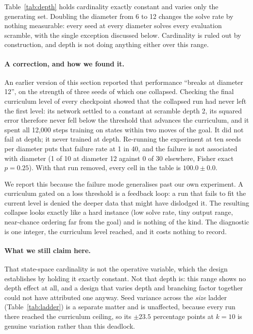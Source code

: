 \documentclass{article}
\begin{document}
Table~\ref{tab:depth} holds cardinality exactly constant and varies only the
generating set. Doubling the diameter from 6 to 12 changes the solve rate by
nothing measurable: every seed at every diameter solves every evaluation
scramble, with the single exception discussed below. Cardinality is ruled out by
construction, and depth is not doing anything either over this range.

\paragraph{A correction, and how we found it.} An earlier version of this section
reported that performance ``breaks at diameter 12'', on the strength of three
seeds of which one collapsed. Checking the final curriculum level of every
checkpoint showed that the collapsed run had never left the first level: its
network settled to a constant at scramble depth 2, its squared error therefore
never fell below the threshold that advances the curriculum, and it spent all
12{,}000 steps training on states within two moves of the goal. It did not fail
at depth; it never trained at depth. Re-running the experiment at ten seeds per
diameter puts that failure rate at 1 in 40, and the failure is not associated
with diameter (1 of 10 at diameter 12 against 0 of 30 elsewhere, Fisher exact
$p = 0.25$). With that run removed, every cell in the table is
$100.0 \pm 0.0$.

We report this because the failure mode generalises past our own experiment. A
curriculum gated on a loss threshold is a feedback loop: a run that fails to fit
the current level is denied the deeper data that might have dislodged it. The
resulting collapse looks exactly like a hard instance (low solve rate, tiny
output range, near-chance ordering far from the goal) and is nothing of the
kind. The diagnostic is one integer, the curriculum level reached, and it costs
nothing to record.

\paragraph{What we still claim here.} That state-space cardinality is not the
operative variable, which the design establishes by holding it exactly constant.
Not that depth is: this range shows no depth effect at all, and a design that
varies depth and branching factor together could not have attributed one anyway.
Seed variance across the \emph{size} ladder (Table~\ref{tab:ladder}) is a
separate matter and is unaffected, because every run there reached the curriculum
ceiling, so its $\pm23.5$ percentage points at $k=10$ is genuine variation rather
than this deadlock.
\end{document}
